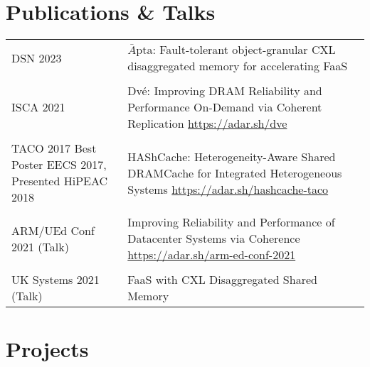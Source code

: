 \documentclass[a4paper,10pt]{article} %
\begin{document}
\section{Publications \& Talks}
\begin{tabular}{p{3cm}p{11cm}}
DSN 2023 &  $\bar{A}$pta: Fault-tolerant object-granular CXL disaggregated memory for \newline accelerating FaaS \\
& \\
ISCA 2021 & Dv\'e: Improving DRAM Reliability and Performance On-Demand via \newline Coherent Replication \hfill  \href{https://adar.sh/dve}{https://adar.sh/dve}\\
&\\
TACO 2017 \newline \footnotesize{Best Poster EECS 2017, Presented HiPEAC 2018} & HAShCache: Heterogeneity-Aware Shared DRAMCache for Integrated Heterogeneous Systems  \hfill
\href{https://adar.sh/hashcache-taco}{https://adar.sh/hashcache-taco}\\
&\\
ARM/UEd Conf 2021 \footnotesize{(Talk)} & Improving Reliability and Performance of Datacenter Systems via \newline Coherence \hfill  \href{https://adar.sh/arm-ed-conf-2021}{https://adar.sh/arm-ed-conf-2021}\\	
&\\
UK Systems 2021 \footnotesize{(Talk)} & FaaS with CXL Disaggregated Shared Memory \\
\end{tabular}

\section{Projects}
\end{document}
